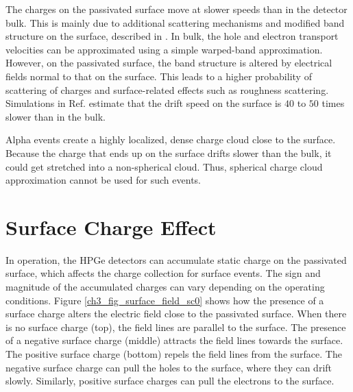 The charges on the passivated surface move at slower speeds than in the detector bulk. This is mainly due to additional scattering mechanisms and modified band structure on the surface, described in \cite{MULLOWNEY201233}. In bulk, the hole and electron transport velocities can be approximated using a simple warped-band approximation. However, on the passivated surface, the band structure is altered by electrical fields normal to that on the surface. This leads to a higher probability of scattering of charges and surface-related effects such as roughness scattering.  Simulations in Ref. \cite{MULLOWNEY201233} estimate that the drift speed on the surface is $40$ to $50$ times slower than in the bulk. 

Alpha events create a highly localized, dense charge cloud close to the surface. Because the charge that ends up on the surface drifts slower than the bulk, it could get stretched into a non-spherical cloud. Thus, spherical charge cloud approximation cannot be used for such events.



\section{Surface Charge Effect}
In operation, the HPGe detectors can accumulate static charge on the passivated surface, which affects the charge collection for surface events. The sign and magnitude of the accumulated charges can vary depending on the operating conditions. Figure \ref{ch3_fig_surface_field_sc0} shows how the presence of a surface charge alters the electric field close to the passivated surface. When there is no surface charge (top), the field lines are parallel to the surface. The presence of a negative surface charge (middle) attracts the field lines towards the surface. The positive surface charge (bottom) repels the field lines from the surface. The negative surface charge can pull the holes to the surface, where they can drift slowly. Similarly, positive surface charges can pull the electrons to the surface.

